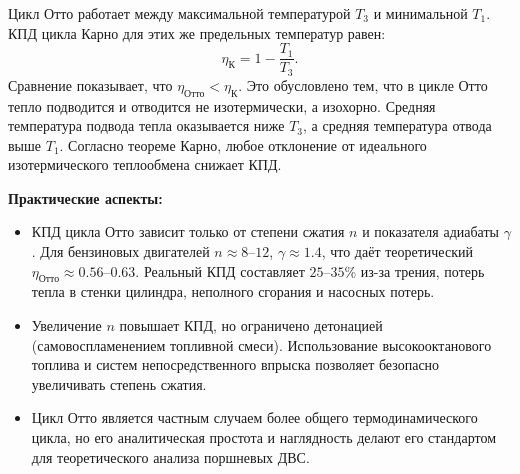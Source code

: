 \begin{property}
Цикл Отто работает между максимальной температурой $T_3$ и минимальной $T_1$. КПД цикла Карно для этих же предельных температур равен:
\begin{equation}
    \eta_{\text{К}} = 1 - \frac{T_1}{T_3}.
\end{equation}
Сравнение показывает, что $\eta_{\text{Отто}} < \eta_{\text{К}}$. Это обусловлено тем, что в цикле Отто тепло подводится и отводится не изотермически, а изохорно. Средняя температура подвода тепла оказывается ниже $T_3$, а средняя температура отвода выше $T_1$. Согласно теореме Карно, любое отклонение от идеального изотермического теплообмена снижает КПД.
\end{property}

\begin{remark}
\textbf{Практические аспекты:}
\begin{itemize}
    \item КПД цикла Отто зависит только от степени сжатия $n$ и показателя адиабаты $\gamma$. Для бензиновых двигателей $n \approx 8 \text{--} 12$, $\gamma \approx 1.4$, что даёт теоретический $\eta_{\text{Отто}} \approx 0.56 \text{--} 0.63$. Реальный КПД составляет $25 \text{--} 35\%$ из-за трения, потерь тепла в стенки цилиндра, неполного сгорания и насосных потерь.
    \item Увеличение $n$ повышает КПД, но ограничено детонацией (самовоспламенением топливной смеси). Использование высокооктанового топлива и систем непосредственного впрыска позволяет безопасно увеличивать степень сжатия.
    \item Цикл Отто является частным случаем более общего термодинамического цикла, но его аналитическая простота и наглядность делают его стандартом для теоретического анализа поршневых ДВС.
\end{itemize}
\end{remark}
